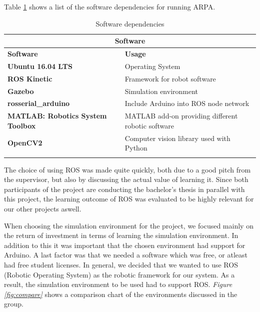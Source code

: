 \documentclass[11pt,a4paper, titlepage]{article}
\begin{document}
Table \ref{software} shows a list of the software dependencies for running ARPA.
	\begin{center}           
    \begin{longtable}{| l | l |}
              \hline
\multicolumn{2}{|c|}{\textbf{Software}} \\ \hline \endhead
\textbf{Software} & \textbf{Usage} \\ \hline             
              \textbf{Ubuntu 16.04 LTS} & Operating System \\ \hline
              
              \textbf{ROS Kinetic} & Framework for robot software \\ \hline
              
              \textbf{Gazebo} & Simulation environment \\  \hline
             
              \textbf{rosserial\_arduino} & Include Arduino into ROS node network \\ \hline
              
              \textbf{MATLAB: Robotics System Toolbox} & MATLAB add-on providing different robotic software \\ \hline
              
              \textbf{OpenCV2} & Computer vision library used with Python \\  \hline

\caption{Software dependencies}
\label{software}                                       
\end{longtable}
\end{center}     

The choice of using ROS was made quite quickly, both due to a good pitch from the supervisor, but also by discussing the actual value of learning it. Since both participants of the project are conducting the bachelor's thesis in parallel with this project, the learning outcome of ROS was evaluated to be highly relevant for our other projects aswell.

When choosing the simulation environment for the project, we focused mainly on the return of investment in terms of learning the simulation environment. In addition to this it was important that the chosen environment had support for Arduino. A last factor was that we needed a software which was free, or atleast had free student licenses. In general, we decided that we wanted to use ROS (Robotic Operating System) as the robotic framework for our system. As a result, the simulation environment to be used had to support ROS. \textit{Figure \ref{fig:compare}} shows a comparison chart of the environments discussed in the group.
\end{document}
